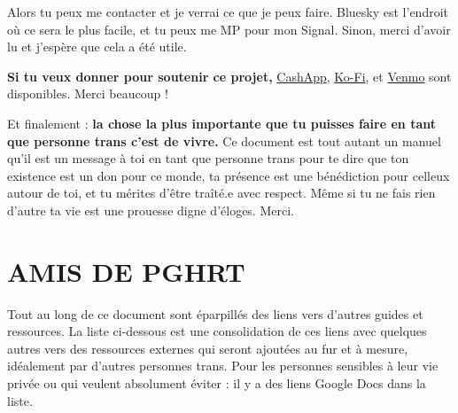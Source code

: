 \documentclass{article}
\begin{document}
Alors tu peux me contacter et je verrai ce que je peux faire. Bluesky est l'endroit où ce sera le plus facile, et tu peux me MP pour mon Signal. Sinon, merci d'avoir lu et j'espère que cela a été utile.

\textbf{Si tu veux donner pour soutenir ce projet,} \href{https://cash.app/Katitties}{CashApp}, \href{https://ko-fi.com/katitties}{Ko-Fi}, et \href{https://account.venmo.com/u/katitties}{Venmo} sont disponibles. Merci beaucoup !

Et finalement : \textbf{la chose la plus importante que tu puisses faire en tant que personne trans c'est de vivre.} Ce document est tout autant un manuel qu'il est un message à toi en tant que personne trans pour te dire que ton existence est un don pour ce monde, ta présence est une bénédiction pour celleux autour de toi, et tu mérites d'être traîté.e avec respect. Même si tu ne fais rien d'autre ta vie est une prouesse digne d'éloges. Merci.



\section*{AMIS DE PGHRT}\label{FOPGHRT}

Tout au long de ce document sont éparpillés des liens vers d'autres guides et ressources. La liste ci-dessous est une consolidation de ces liens avec quelques autres vers des ressources externes qui seront ajoutées au fur et à mesure, idéalement par d'autres personnes trans. Pour les personnes sensibles à leur vie privée ou qui veulent absolument éviter : il y a des liens Google Docs dans la liste.
\end{document}
